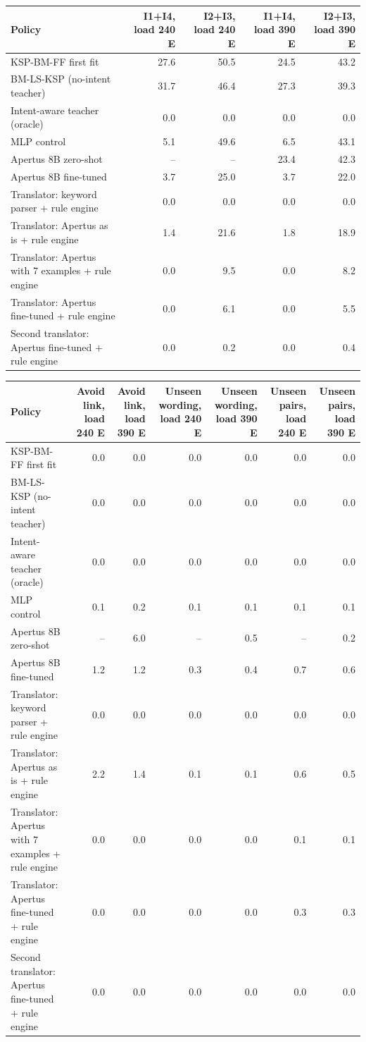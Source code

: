 \begin{tabular}{lrrrr}
\toprule
Policy & I1+I4, load 240 E & I2+I3, load 240 E & I1+I4, load 390 E & I2+I3, load 390 E \\
\midrule
KSP-BM-FF first fit & 27.6 & 50.5 & 24.5 & 43.2 \\
BM-LS-KSP (no-intent teacher) & 31.7 & 46.4 & 27.3 & 39.3 \\
Intent-aware teacher (oracle) & 0.0 & 0.0 & 0.0 & 0.0 \\
MLP control & 5.1 & 49.6 & 6.5 & 43.1 \\
Apertus 8B zero-shot & -- & -- & 23.4 & 42.3 \\
Apertus 8B fine-tuned & 3.7 & 25.0 & 3.7 & 22.0 \\
Translator: keyword parser + rule engine & 0.0 & 0.0 & 0.0 & 0.0 \\
Translator: Apertus as is + rule engine & 1.4 & 21.6 & 1.8 & 18.9 \\
Translator: Apertus with 7 examples + rule engine & 0.0 & 9.5 & 0.0 & 8.2 \\
Translator: Apertus fine-tuned + rule engine & 0.0 & 6.1 & 0.0 & 5.5 \\
Second translator: Apertus fine-tuned + rule engine & 0.0 & 0.2 & 0.0 & 0.4 \\
\bottomrule
\end{tabular}

\begin{tabular}{lrrrrrr}
\toprule
Policy & Avoid link, load 240 E & Avoid link, load 390 E & Unseen wording, load 240 E & Unseen wording, load 390 E & Unseen pairs, load 240 E & Unseen pairs, load 390 E \\
\midrule
KSP-BM-FF first fit & 0.0 & 0.0 & 0.0 & 0.0 & 0.0 & 0.0 \\
BM-LS-KSP (no-intent teacher) & 0.0 & 0.0 & 0.0 & 0.0 & 0.0 & 0.0 \\
Intent-aware teacher (oracle) & 0.0 & 0.0 & 0.0 & 0.0 & 0.0 & 0.0 \\
MLP control & 0.1 & 0.2 & 0.1 & 0.1 & 0.1 & 0.1 \\
Apertus 8B zero-shot & -- & 6.0 & -- & 0.5 & -- & 0.2 \\
Apertus 8B fine-tuned & 1.2 & 1.2 & 0.3 & 0.4 & 0.7 & 0.6 \\
Translator: keyword parser + rule engine & 0.0 & 0.0 & 0.0 & 0.0 & 0.0 & 0.0 \\
Translator: Apertus as is + rule engine & 2.2 & 1.4 & 0.1 & 0.1 & 0.6 & 0.5 \\
Translator: Apertus with 7 examples + rule engine & 0.0 & 0.0 & 0.0 & 0.0 & 0.1 & 0.1 \\
Translator: Apertus fine-tuned + rule engine & 0.0 & 0.0 & 0.0 & 0.0 & 0.3 & 0.3 \\
Second translator: Apertus fine-tuned + rule engine & 0.0 & 0.0 & 0.0 & 0.0 & 0.0 & 0.0 \\
\bottomrule
\end{tabular}

